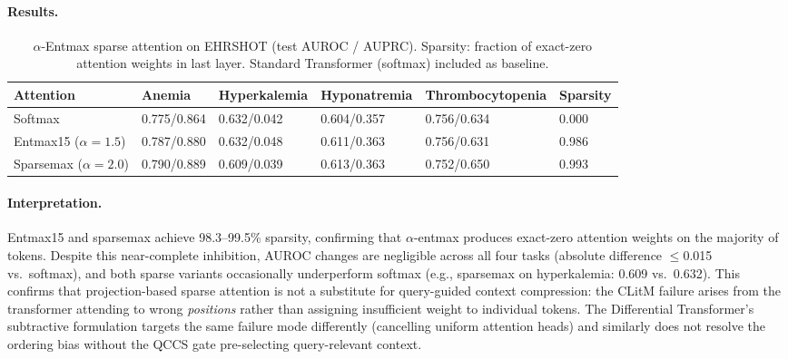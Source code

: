 \documentclass{article}
\begin{document}
\paragraph{Results.}

\begin{table}[H]
\centering
\caption{$\alpha$-Entmax sparse attention on EHRSHOT (test AUROC / AUPRC).
  Sparsity: fraction of exact-zero attention weights in last layer.
  Standard Transformer (softmax) included as baseline.}
\label{tab:sparse_attn}
\small
\setlength{\tabcolsep}{4pt}
\begin{tabular}{@{}lp{1.5cm}p{1.5cm}p{1.5cm}p{1.5cm}p{1.2cm}@{}}
\toprule
Attention & Anemia & Hyperkalemia & Hyponatremia & Thrombocytopenia & Sparsity \\
\midrule
Softmax   & 0.775/0.864 & 0.632/0.042 & 0.604/0.357 & 0.756/0.634 & 0.000 \\
Entmax15 ($\alpha{=}1.5$) & 0.787/0.880 & 0.632/0.048 & 0.611/0.363 & 0.756/0.631 & 0.986 \\
Sparsemax ($\alpha{=}2.0$) & 0.790/0.889 & 0.609/0.039 & 0.613/0.363 & 0.752/0.650 & 0.993 \\
\bottomrule
\end{tabular}
\end{table}

\paragraph{Interpretation.}
Entmax15 and sparsemax achieve 98.3--99.5\% sparsity, confirming that
$\alpha$-entmax produces exact-zero attention weights on the majority of
tokens. Despite this near-complete inhibition, AUROC changes are negligible
across all four tasks (absolute difference $\leq$0.015 vs.\ softmax), and
both sparse variants occasionally underperform softmax (e.g., sparsemax on
hyperkalemia: 0.609 vs.\ 0.632). This confirms that projection-based sparse
attention is not a substitute for query-guided context compression: the
CLitM failure arises from the transformer attending to wrong \emph{positions}
rather than assigning insufficient weight to individual tokens. The Differential
Transformer's subtractive formulation targets the same failure mode differently
(cancelling uniform attention heads) and similarly does not resolve the ordering
bias without the QCCS gate pre-selecting query-relevant context.
\end{document}
